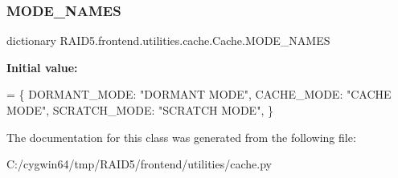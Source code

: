 \subsubsection{\texorpdfstring{M\+O\+D\+E\+\_\+\+N\+A\+M\+ES}{MODE\_NAMES}}
{\footnotesize\ttfamily dictionary R\+A\+I\+D5.\+frontend.\+utilities.\+cache.\+Cache.\+M\+O\+D\+E\+\_\+\+N\+A\+M\+ES\hspace{0.3cm}{\ttfamily [static]}}

{\bfseries Initial value\+:}
\begin{DoxyCode}
=  \{
        DORMANT\_MODE: \textcolor{stringliteral}{"DORMANT MODE"},
        CACHE\_MODE: \textcolor{stringliteral}{"CACHE MODE"},
        SCRATCH\_MODE: \textcolor{stringliteral}{"SCRATCH MODE"},
    \}
\end{DoxyCode}


The documentation for this class was generated from the following file\+:\begin{DoxyCompactItemize}
\item 
C\+:/cygwin64/tmp/\+R\+A\+I\+D5/frontend/utilities/cache.\+py\end{DoxyCompactItemize}
